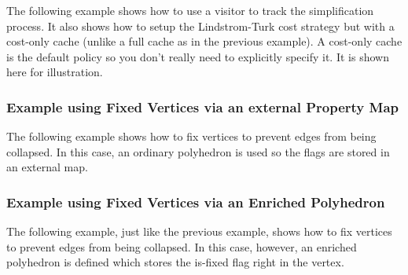 The following example shows how to use a visitor to track the simplification process. 
It also shows how to setup the Lindstrom-Turk cost strategy but with a cost-only 
cache (unlike a full cache as in the previous example). A cost-only cache is
the default policy so you don't really need to explicitly specify it. It is shown here
for illustration.



\subsubsection{Example using Fixed Vertices via an external Property Map}

The following example shows how to fix vertices to prevent edges from being collapsed. 
In this case, an ordinary polyhedron is used so the flags are stored 
in an external map.


\subsubsection{Example using Fixed Vertices via an Enriched Polyhedron}

The following example, just like the previous example, shows how to fix vertices to 
prevent edges from being collapsed. In this case, however, an enriched polyhedron 
is defined which stores the is-fixed flag right in the vertex.




